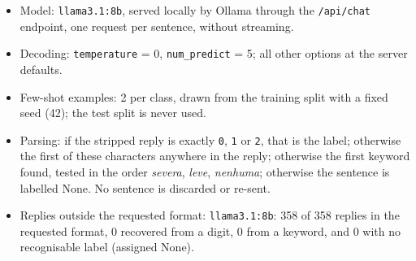 \begin{itemize}
\item Model: \texttt{llama3.1:8b}, served locally by Ollama through the \texttt{/api/chat}
  endpoint, one request per sentence, without streaming.
\item Decoding: \texttt{temperature} = 0, \texttt{num\_predict} = 5; all other options at
  the server defaults.
\item Few-shot examples: 2 per class, drawn from the training split with a fixed seed
  (42); the test split is never used.
\item Parsing: if the stripped reply is exactly \texttt{0}, \texttt{1} or \texttt{2}, that
  is the label; otherwise the first of these characters anywhere in the reply; otherwise
  the first keyword found, tested in the order \emph{severa}, \emph{leve}, \emph{nenhuma};
  otherwise the sentence is labelled None. No sentence is discarded or re-sent.
\item Replies outside the requested format: \texttt{llama3.1:8b}: 358 of 358 replies in
  the requested format, 0 recovered from a digit, 0 from a keyword, and 0 with no
  recognisable label (assigned None).
\end{itemize}
